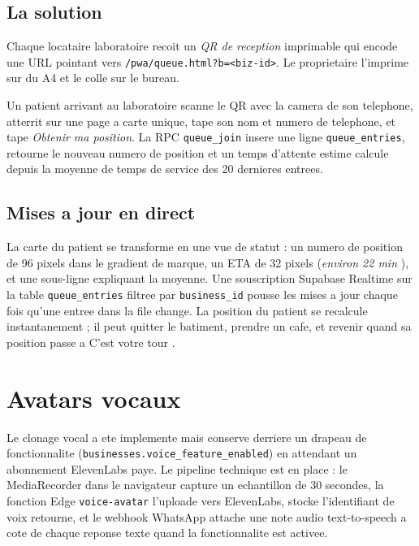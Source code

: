 \subsection{La solution}
Chaque locataire laboratoire recoit un \emph{QR de reception}
imprimable qui encode une URL pointant vers
\texttt{/pwa/queue.html?b=<biz-id>}. Le proprietaire l'imprime sur du
A4 et le colle sur le bureau.

Un patient arrivant au laboratoire scanne le QR avec la camera de son
telephone, atterrit sur une page a carte unique, tape son nom et
numero de telephone, et tape \emph{Obtenir ma position}. La RPC
\texttt{queue\_join} insere une ligne \texttt{queue\_entries},
retourne le nouveau numero de position et un temps d'attente estime
calcule depuis la moyenne de temps de service des 20 dernieres
entrees.

\subsection{Mises a jour en direct}
La carte du patient se transforme en une vue de statut : un numero
de position de 96 pixels dans le gradient de marque, un ETA de 32
pixels (\emph{\og environ 22 min \fg{}}), et une sous-ligne expliquant
la moyenne. Une souscription Supabase Realtime sur la table
\texttt{queue\_entries} filtree par \texttt{business\_id} pousse les
mises a jour chaque fois qu'une entree dans la file change. La
position du patient se recalcule instantanement ; il peut quitter le
batiment, prendre un cafe, et revenir quand sa position passe a
\og C'est votre tour \fg{}.

\section{Avatars vocaux}
Le clonage vocal a ete implemente mais conserve derriere un drapeau
de fonctionnalite (\texttt{businesses.voice\_feature\_enabled}) en
attendant un abonnement ElevenLabs paye. Le pipeline technique est en
place : le MediaRecorder dans le navigateur capture un echantillon de
30 secondes, la fonction Edge \texttt{voice-avatar} l'uploade vers
ElevenLabs, stocke l'identifiant de voix retourne, et le webhook
WhatsApp attache une note audio text-to-speech a cote de chaque
reponse texte quand la fonctionnalite est activee.

